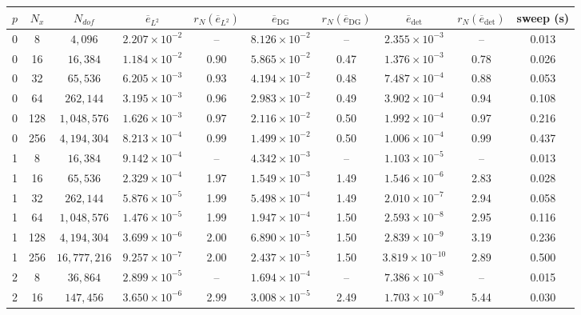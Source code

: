 \documentclass[final]{amsart}
\begin{document}
\begin{table}[h!]
\centering
\scriptsize
\setlength{\tabcolsep}{3.5pt}
\begin{tabular}{cccccccccc}
\hline
$p$ & $N_x$ & $N_{dof}$ & $\overline{e}_{L^2}$ & $r_N(\overline{e}_{L^2})$ & $\overline{e}_{\mathrm{DG}}$ & $r_N(\overline{e}_{\mathrm{DG}})$ & $\overline{e}_{\mathrm{det}}$ & $r_N(\overline{e}_{\mathrm{det}})$ & sweep (s) \\
\hline
0 & 8 & $4,096$ & $2.207\times 10^{-2}$ & -- & $8.126\times 10^{-2}$ & -- & $2.355\times 10^{-3}$ & -- & 0.013 \\
0 & 16 & $16,384$ & $1.184\times 10^{-2}$ & 0.90 & $5.865\times 10^{-2}$ & 0.47 & $1.376\times 10^{-3}$ & 0.78 & 0.026 \\
0 & 32 & $65,536$ & $6.205\times 10^{-3}$ & 0.93 & $4.194\times 10^{-2}$ & 0.48 & $7.487\times 10^{-4}$ & 0.88 & 0.053 \\
0 & 64 & $262,144$ & $3.195\times 10^{-3}$ & 0.96 & $2.983\times 10^{-2}$ & 0.49 & $3.902\times 10^{-4}$ & 0.94 & 0.108 \\
0 & 128 & $1,048,576$ & $1.626\times 10^{-3}$ & 0.97 & $2.116\times 10^{-2}$ & 0.50 & $1.992\times 10^{-4}$ & 0.97 & 0.216 \\
0 & 256 & $4,194,304$ & $8.213\times 10^{-4}$ & 0.99 & $1.499\times 10^{-2}$ & 0.50 & $1.006\times 10^{-4}$ & 0.99 & 0.437 \\
\hline
1 & 8 & $16,384$ & $9.142\times 10^{-4}$ & -- & $4.342\times 10^{-3}$ & -- & $1.103\times 10^{-5}$ & -- & 0.013 \\
1 & 16 & $65,536$ & $2.329\times 10^{-4}$ & 1.97 & $1.549\times 10^{-3}$ & 1.49 & $1.546\times 10^{-6}$ & 2.83 & 0.028 \\
1 & 32 & $262,144$ & $5.876\times 10^{-5}$ & 1.99 & $5.498\times 10^{-4}$ & 1.49 & $2.010\times 10^{-7}$ & 2.94 & 0.058 \\
1 & 64 & $1,048,576$ & $1.476\times 10^{-5}$ & 1.99 & $1.947\times 10^{-4}$ & 1.50 & $2.593\times 10^{-8}$ & 2.95 & 0.116 \\
1 & 128 & $4,194,304$ & $3.699\times 10^{-6}$ & 2.00 & $6.890\times 10^{-5}$ & 1.50 & $2.839\times 10^{-9}$ & 3.19 & 0.236 \\
1 & 256 & $16,777,216$ & $9.257\times 10^{-7}$ & 2.00 & $2.437\times 10^{-5}$ & 1.50 & $3.819\times 10^{-10}$ & 2.89 & 0.500 \\
\hline
2 & 8 & $36,864$ & $2.899\times 10^{-5}$ & -- & $1.694\times 10^{-4}$ & -- & $7.386\times 10^{-8}$ & -- & 0.015 \\
2 & 16 & $147,456$ & $3.650\times 10^{-6}$ & 2.99 & $3.008\times 10^{-5}$ & 2.49 & $1.703\times 10^{-9}$ & 5.44 & 0.030 \\

\end{tabular}
\end{table}
\end{document}
